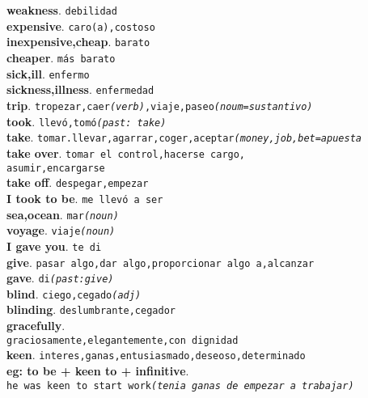 \documentclass[twocolumn]{article}
\begin{document}
	\textsf{\textbf{weakness}}. \texttt{debilidad}\\
	\textsf{\textbf{expensive}}. \texttt{caro(a),costoso}\\
	\textsf{\textbf{inexpensive,cheap}}. \texttt{barato}\\
	\textsf{\textbf{cheaper}}. \texttt{m\'as barato}\\
	\textsf{\textbf{sick,ill}}. \texttt{enfermo}\\
	\textsf{\textbf{sickness,illness}}. \texttt{enfermedad}\\
	\textsf{\textbf{trip}}. \texttt{tropezar,caer{\scriptsize \textsl{(verb)}},viaje,paseo{\scriptsize \textsl{(noum=sustantivo)}}}\\
	\textsf{\textbf{took}}. \texttt{llev\'o,tom\'o{\scriptsize \textsl{(past: take)}}}\\
	\textsf{\textbf{take}}. \texttt{tomar.llevar,agarrar,coger,aceptar{\scriptsize \textsl{(money,job,bet=apuesta}}}\\
	\textsf{\textbf{take over}}. \texttt{tomar el control,hacerse cargo,\\asumir,encargarse}\\
	\textsf{\textbf{take off}}. \texttt{despegar,empezar}\\
	\textsf{\textbf{I took to be}}. \texttt{me llev\'o a ser}\\
	\textsf{\textbf{sea,ocean}}. \texttt{mar{\scriptsize \textsl{(noun)}}}\\
	\textsf{\textbf{voyage}}. \texttt{viaje{\scriptsize \textsl{(noun)}}}\\
	\textsf{\textbf{I gave you}}. \texttt{te di}\\
	\textsf{\textbf{give}}. \texttt{pasar algo,dar algo,proporcionar algo a,alcanzar}\\
	\textsf{\textbf{gave}}. \texttt{di{\scriptsize \textsl{(past:give)}}}\\
	\textsf{\textbf{blind}}. \texttt{ciego,cegado{\scriptsize \textsl{(adj)}}}\\
	\textsf{\textbf{blinding}}. \texttt{deslumbrante,cegador}\\
	\textsf{\textbf{gracefully}}.\\\texttt{graciosamente,elegantemente,con dignidad}\\
	\textsf{\textbf{keen}}. \texttt{interes,ganas,entusiasmado,deseoso,determinado}\\
	{\scriptsize \textsf{\textbf{eg: to be + keen to + infinitive}}.\\
	\texttt{he was keen to start work{\scriptsize \textsl{(tenia ganas de empezar a trabajar)}}}}\\
\end{document}
